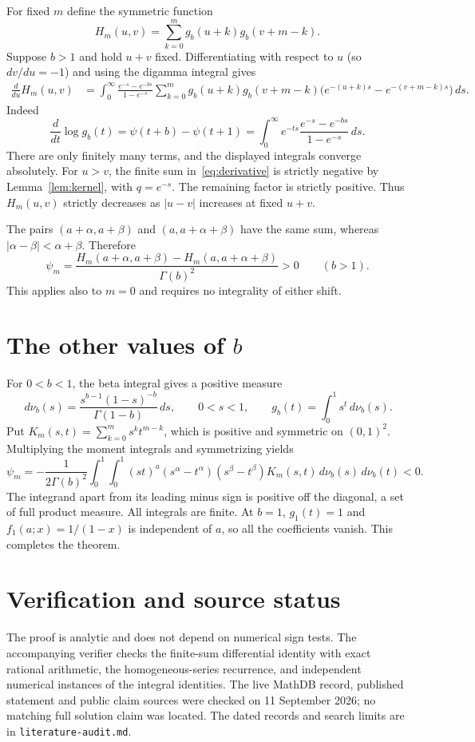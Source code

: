 \documentclass[11pt]{article}
\newcommand{\G}{\Gamma}
\newcommand{\dd}{\,d}
\begin{document}
For fixed $m$ define the symmetric function
\[
 H_m(u,v)=\sum_{k=0}^m g_b(u+k)g_b(v+m-k).
\]
Suppose $b>1$ and hold $u+v$ fixed. Differentiating with respect to $u$
(so $dv/du=-1$) and using the digamma integral gives
\begin{align}
 \frac{d}{du}H_m(u,v)
 &=\int_0^\infty
       \frac{e^{-s}-e^{-bs}}{1-e^{-s}}
       \sum_{k=0}^m g_b(u+k)g_b(v+m-k)
       \bigl(e^{-(u+k)s}-e^{-(v+m-k)s}\bigr)\dd s .
 \label{eq:derivative}
\end{align}
Indeed
\[
 \frac{d}{dt}\log g_b(t)
 =\psi(t+b)-\psi(t+1)
 =\int_0^\infty e^{-ts}
       \frac{e^{-s}-e^{-bs}}{1-e^{-s}}\dd s .
\]
There are only finitely many terms, and the displayed integrals converge
absolutely. For $u>v$, the finite sum in~\eqref{eq:derivative} is
strictly negative by Lemma~\ref{lem:kernel}, with $q=e^{-s}$.
The remaining factor is strictly positive. Thus
$H_m(u,v)$ strictly decreases as $|u-v|$ increases at fixed $u+v$.

The pairs $(a+\alpha,a+\beta)$ and $(a,a+\alpha+\beta)$ have the
same sum, whereas $|\alpha-\beta|<\alpha+\beta$. Therefore
\[
 \psi_m=\frac{H_m(a+\alpha,a+\beta)-H_m(a,a+\alpha+\beta)}
                {\G(b)^2}>0
 \qquad(b>1).
\]
This applies also to $m=0$ and requires no integrality of either shift.

\section*{The other values of \(b\)}

For $0<b<1$, the beta integral gives a positive measure
\[
 \dd\nu_b(s)=
 \frac{s^{b-1}(1-s)^{-b}}{\G(1-b)}\dd s,\qquad 0<s<1,
 \qquad g_b(t)=\int_0^1s^t\dd\nu_b(s).
\]
Put $K_m(s,t)=\sum_{k=0}^m s^kt^{m-k}$, which is positive and symmetric
on $(0,1)^2$. Multiplying the moment integrals and symmetrizing yields
\[
 \psi_m=-\frac1{2\G(b)^2}
 \int_0^1\int_0^1
 (st)^a(s^\alpha-t^\alpha)(s^\beta-t^\beta)
 K_m(s,t)\dd\nu_b(s)\dd\nu_b(t)<0.
\]
The integrand apart from its leading minus sign is positive off the
diagonal, a set of full product measure. All integrals are finite.
At $b=1$, $g_1(t)=1$ and $f_1(a;x)=1/(1-x)$ is independent of $a$,
so all the coefficients vanish. This completes the theorem.

\section*{Verification and source status}

The proof is analytic and does not depend on numerical sign tests.
The accompanying verifier checks the finite-sum differential identity
with exact rational arithmetic, the homogeneous-series recurrence,
and independent numerical instances of the integral identities.
The live MathDB record, published statement and public claim sources
were checked on 11 September 2026; no matching full solution claim was
located. The dated records and search limits are in
\texttt{literature-audit.md}.
\end{document}
